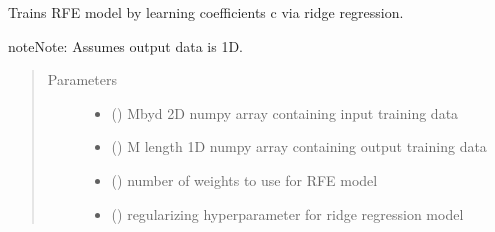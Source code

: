\documentclass[letterpaper,10pt,english]{sphinxmanual}
\begin{document}
\begin{fulllineitems}
\begin{fulllineitems}
\end{fulllineitems}


\begin{fulllineitems}
\label{\detokenize{rom:rom.response_surfaces.RFE.train}}
\sphinxAtStartPar
Trains RFE model by learning coefficients c via ridge regression.

\begin{sphinxadmonition}{note}{Note:}
\sphinxAtStartPar
Assumes output data is 1D.
\end{sphinxadmonition}
\begin{quote}\begin{description}
\item[{Parameters}] \leavevmode\begin{itemize}
\item {} 
\sphinxAtStartPar
{} () \textendash{} M\sphinxhyphen{}by\sphinxhyphen{}d 2D numpy array containing input training data

\item {} 
\sphinxAtStartPar
{} () \textendash{} M length 1D numpy array containing output training data

\item {} 
\sphinxAtStartPar
{} () \textendash{} number of weights to use for RFE model

\item {} 
\sphinxAtStartPar
{} () \textendash{} regularizing hyperparameter for ridge regression model

\end{itemize}

\end{description}\end{quote}

\end{fulllineitems}


\end{fulllineitems}
\end{document}
